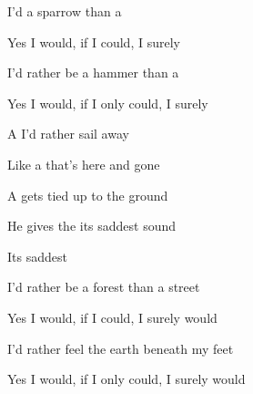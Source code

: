 

\zs
I'd  a sparrow than a 

Yes I would, if I could, I surely 

I'd rather be a hammer than a 

Yes I would, if I only could, I surely 
\ks

\zr
A I'd rather sail away

Like a  that's here and gone

A  gets tied up to the ground

He gives the  its saddest sound

Its saddest 
\kr

\zs
I'd rather be a forest than a street

Yes I would, if I could, I surely would

I'd rather feel the earth beneath my feet

Yes I would, if I only could, I surely would
\ks

\zr\kr

\kp
